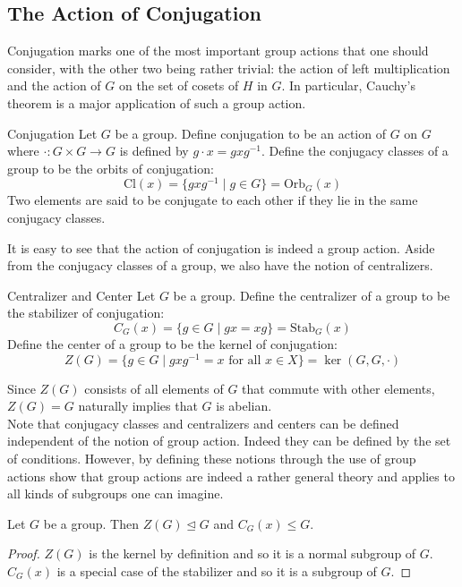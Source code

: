 \documentclass[a4paper]{article}
\begin{document}
\subsection{The Action of Conjugation}
Conjugation marks one of the most important group actions that one should consider, with the other two being rather trivial: the action of left multiplication and the action of $G$ on the set of cosets of $H$ in $G$. In particular, Cauchy's theorem is a major application of such a group action. 

\begin{defn}{Conjugation}{} Let $G$ be a group. Define conjugation to be an action of $G$ on $G$ where $\cdot:G\times G\to G$ is defined by $g\cdot x=gxg^{-1}$. Define the conjugacy classes of a group to be the orbits of conjugation: $$\text{Cl}(x)=\{gxg^{-1}\;|\;g\in G\}=\text{Orb}_G(x)$$ Two elements are said to be conjugate to each other if they lie in the same conjugacy classes. 
\end{defn}

It is easy to see that the action of conjugation is indeed a group action. Aside from the conjugacy classes of a group, we also have the notion of centralizers. 

\begin{defn}{Centralizer and Center}{} Let $G$ be a group. Define the centralizer of a group to be the stabilizer of conjugation: $$C_G(x)=\{g\in G\;|\;gx=xg\}=\text{Stab}_G(x)$$ Define the center of a group to be the kernel of conjugation: $$Z(G)=\{g\in G\;|\;gxg^{-1}=x\text{ for all }x\in X\}=\ker(G,G,\cdot)$$
\end{defn}

Since $Z(G)$ consists of all elements of $G$ that commute with other elements,  $Z(G)=G$ naturally implies that $G$ is abelian. \\

Note that conjugacy classes and centralizers and centers can be defined independent of the notion of group action. Indeed they can be defined by the set of conditions. However, by defining these notions through the use of group actions show that group actions are indeed a rather general theory and applies to all kinds of subgroups one can imagine. 

\begin{lmm}{}{} Let $G$ be a group. Then $Z(G)\trianglelefteq G$ and $C_G(x)\leq G$. 
\begin{proof}
$Z(G)$ is the kernel by definition and so it is a normal subgroup of $G$. $C_G(x)$ is a special case of the stabilizer and so it is a subgroup of $G$. 
\end{proof}
\end{lmm}
\end{document}
